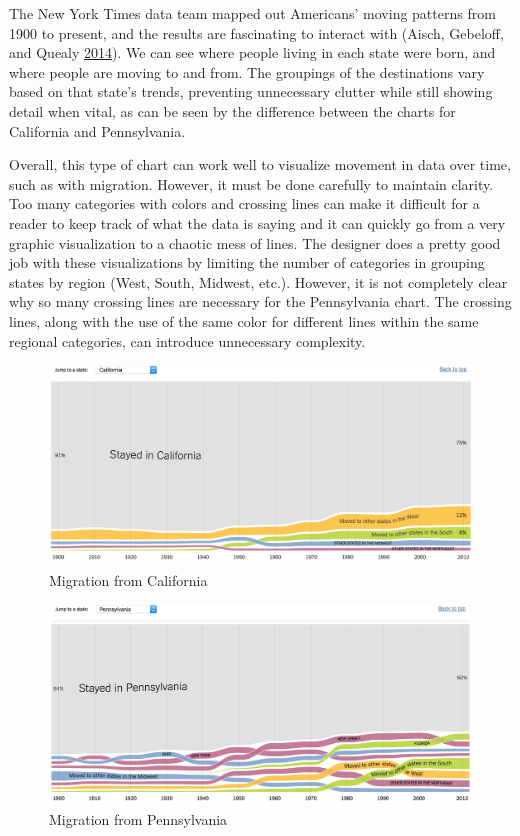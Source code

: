 \documentclass[]{book}
\theoremstyle{definition}
\theoremstyle{definition}
\theoremstyle{definition}
\theoremstyle{remark}
\begin{document}
The New York Times data team mapped out Americans' moving patterns from
1900 to present, and the results are fascinating to interact with
(Aisch, Gebeloff, and Quealy \protect\hyperlink{ref-migration}{2014}).
We can see where people living in each state were born, and where people
are moving to and from. The groupings of the destinations vary based on
that state's trends, preventing unnecessary clutter while still showing
detail when vital, as can be seen by the difference between the charts
for California and Pennsylvania.

Overall, this type of chart can work well to visualize movement in data
over time, such as with migration. However, it must be done carefully to
maintain clarity. Too many categories with colors and crossing lines can
make it difficult for a reader to keep track of what the data is saying
and it can quickly go from a very graphic visualization to a chaotic
mess of lines. The designer does a pretty good job with these
visualizations by limiting the number of categories in grouping states
by region (West, South, Midwest, etc.). However, it is not completely
clear why so many crossing lines are necessary for the Pennsylvania
chart. The crossing lines, along with the use of the same color for
different lines within the same regional categories, can introduce
unnecessary complexity.

\begin{figure}
\centering
\includegraphics{images/CA_migration.png}
\caption{Migration from California}
\end{figure}

\begin{figure}
\centering
\includegraphics{images/PA_migration.png}
\caption{Migration from Pennsylvania}
\end{figure}
\end{document}
